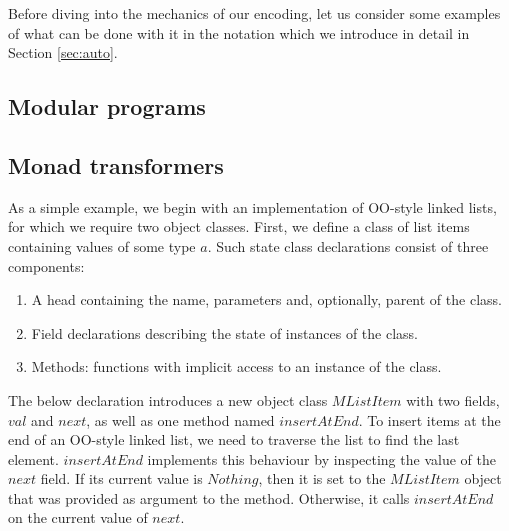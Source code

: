 \documentclass[authoryear,preprint]{sigplanconf}
\begin{document}
Before diving into the mechanics of our encoding, let us consider some examples of what can be done with it in the notation which we introduce in detail in Section \ref{sec:auto}. %

\subsection{Modular programs}
\subsection{Monad transformers}



As a simple example, we begin with an implementation of OO-style linked lists, for which we require two object classes. First, we define a class of list items containing values of some type $a$. Such state class declarations consist of three components: 
\begin{enumerate}
    \item A head containing the name, parameters and, optionally, parent of the class.
    \item Field declarations describing the state of instances of the class.
    \item Methods: functions with implicit access to an instance of the class.
\end{enumerate}
The below declaration introduces a new object class $\mathit{MListItem}$ with two fields, $\mathit{val}$ and $\mathit{next}$, as well as one method named $\mathit{insertAtEnd}$. To insert items at the end of an OO-style linked list, we need to traverse the list to find the last element.  $\mathit{insertAtEnd}$ implements this behaviour by inspecting the value of the $\mathit{next}$ field. If its current value is $\mathit{Nothing}$, then it is set to the $\mathit{MListItem}$ object that was provided as argument to the method. Otherwise, it calls $\mathit{insertAtEnd}$ on the current value of $\mathit{next}$.
\end{document}
